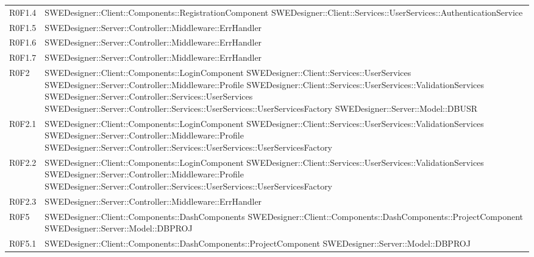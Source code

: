 \begin{center}
\begin{longtable}{p{2cm}!{\VRule[1pt]}p{14cm}}
R0F1.4 & SWEDesigner::Client::Components::RegistrationComponent \newline SWEDesigner::Client::Services::UserServices::AuthenticationService \\
R0F1.5  & SWEDesigner::Server::Controller::Middleware::ErrHandler \\
R0F1.6 & SWEDesigner::Server::Controller::Middleware::ErrHandler \\
R0F1.7 & SWEDesigner::Server::Controller::Middleware::ErrHandler \\
R0F2 & SWEDesigner::Client::Components::LoginComponent \newline SWEDesigner::Client::Services::UserServices \newline SWEDesigner::Server::Controller::Middleware::Profile \newline SWEDesigner::Client::Services::UserServices::ValidationServices \newline SWEDesigner::Server::Controller::Services::UserServices \newline SWEDesigner::Server::Controller::Services::UserServices::UserServicesFactory \newline SWEDesigner::Server::Model::DBUSR \\
R0F2.1 & SWEDesigner::Client::Components::LoginComponent \newline SWEDesigner::Client::Services::UserServices::ValidationServices \newline SWEDesigner::Server::Controller::Middleware::Profile \newline SWEDesigner::Server::Controller::Services::UserServices::UserServicesFactory \\
R0F2.2 & SWEDesigner::Client::Components::LoginComponent \newline SWEDesigner::Client::Services::UserServices::ValidationServices \newline SWEDesigner::Server::Controller::Middleware::Profile \newline SWEDesigner::Server::Controller::Services::UserServices::UserServicesFactory \\
R0F2.3 & SWEDesigner::Server::Controller::Middleware::ErrHandler \\
R0F5 & SWEDesigner::Client::Components::DashComponents \newline SWEDesigner::Client::Components::DashComponents::ProjectComponent \newline SWEDesigner::Server::Model::DBPROJ \\
R0F5.1 & SWEDesigner::Client::Components::DashComponents::ProjectComponent \newline SWEDesigner::Server::Model::DBPROJ \\

\end{longtable}
\end{center}
